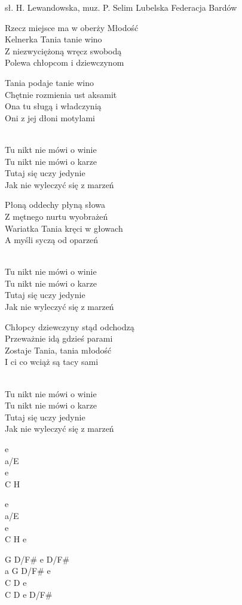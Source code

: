 {sł. H. Lewandowska, muz. P. Selim}
{Lubelska Federacja Bardów}
\begin{text}
Rzecz miejsce ma w oberży Młodość\\
Kelnerka Tania tanie wino\\
Z niezwyciężoną wręcz swobodą\\
Polewa chłopcom i dziewczynom

Tania podaje tanie wino\\
Chętnie rozmienia ust aksamit\\
Ona tu sługą i władczynią\\
Oni z jej dłoni motylami

\vin [2x]\\
\vin Tu nikt nie mówi o winie\\
\vin Tu nikt nie mówi o karze\\
\vin Tutaj się uczy jedynie\\
\vin Jak nie wyleczyć się z marzeń

Płoną oddechy płyną słowa\\
Z mętnego nurtu wyobrażeń\\
Wariatka Tania kręci w głowach\\
A myśli syczą od oparzeń

\vin [2x]\\
\vin Tu nikt nie mówi o winie\\
\vin Tu nikt nie mówi o karze\\
\vin Tutaj się uczy jedynie\\
\vin Jak nie wyleczyć się z marzeń

Chłopcy dziewczyny stąd odchodzą\\
Przeważnie idą gdzieś parami\\
Zostaje Tania, tania młodość\\
I ci co wciąż są tacy sami

\vin [2x]\\
\vin Tu nikt nie mówi o winie\\
\vin Tu nikt nie mówi o karze\\
\vin Tutaj się uczy jedynie\\
\vin Jak nie wyleczyć się z marzeń
\end{text}
\begin{chord}
e\\
a/E\\
e\\
C H

e\\
a/E\\
e\\
C H e

\hfill\break
G D/F# e D/F#\\
a G D/F# e\\
C D e\\
C D e D/F#
\end{chord}
